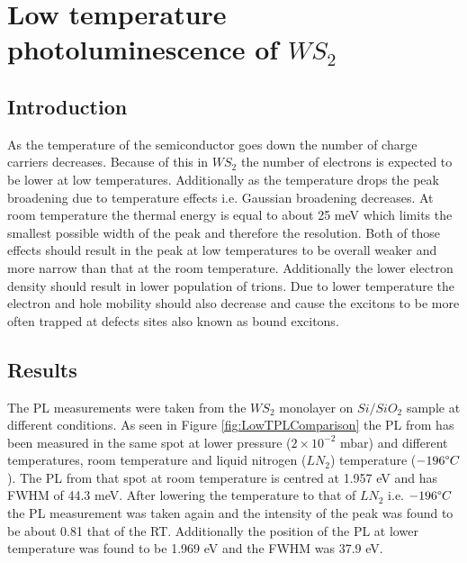 \chapter{Low temperature photoluminescence of $WS_2$}

\section{Introduction}

As the temperature of the semiconductor goes down the number of charge carriers decreases. Because of this in $WS_2$ the number of electrons is expected to be lower at low temperatures. Additionally as the temperature drops the peak broadening due to temperature effects i.e. Gaussian broadening decreases. At room temperature the thermal energy is equal to about 25 meV which limits the smallest possible width of the peak and therefore the resolution. Both of those effects should result in the peak at low temperatures to be overall weaker and more narrow than that at the room temperature. Additionally the lower electron density should result in lower population of trions. Due to lower temperature the electron and hole mobility should also decrease and cause the excitons to be more often trapped at defects sites also known as bound excitons.

\section{Results}

The PL measurements were taken from the $WS_2$ monolayer on $Si/SiO_2$ sample at different conditions. As seen in Figure \ref{fig:LowTPLComparison} the PL from has been measured in the same spot at lower pressure ($2 \times 10^{-2}$ mbar) and different temperatures, room temperature and liquid nitrogen ($LN_2$) temperature ($-196 \degree C$). The PL from that spot at room temperature is centred at 1.957 eV and has FWHM of 44.3 meV. After lowering the temperature to that of $LN_2$ i.e. $-196 \degree C$ the PL measurement was taken again and the intensity of the peak was found to be about 0.81 that of the RT. Additionally the position of the PL at lower temperature was found to be 1.969 eV and the FWHM was 37.9 eV.

